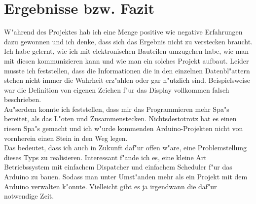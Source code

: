 \documentclass[a4paper]{scrreprt}
\begin{document}
	\chapter{Ergebnisse bzw. Fazit}
		W"ahrend des Projektes hab ich eine Menge positive wie negative Erfahrungen dazu 
		gewonnen und ich denke, dass sich das Ergebnis nicht zu verstecken braucht.
		Ich habe gelernt, wie ich mit elektronischen Bauteilen umzugehen habe, wie man 
		mit diesen kommunizieren kann und wie man ein solches Projekt aufbaut.
		Leider musste ich feststellen, dass die Informationen die in den einzelnen
		Datenbl"attern stehen nicht immer die Wahrheit erz"ahlen oder gar n"utzlich sind. 
		Beispielsweise war die Definition von eigenen Zeichen f"ur das Display 
		vollkommen falsch beschrieben. \\
		Au"serdem konnte ich feststellen, dass mir das Programmieren mehr Spa"s bereitet, als 
		das L"oten und Zusammenstecken. Nichtsdestotrotz hat es einen riesen Spa"s gemacht
		und ich w"urde kommenden Arduino-Projekten nicht von vornherein einen Stein in den
		Weg legen. \\
		Das bedeutet, dass ich auch in Zukunft daf"ur offen w"are, eine Problemstellung 
		dieses Typs zu realisieren.
		Interessant f"ande ich es, eine kleine Art Betriebssystem mit einfachem Dispatcher und
		einfachem Scheduler f"ur das Arduino zu bauen.
		Sodass man unter Umst"anden mehr als ein Projekt mit dem Arduino verwalten k"onnte.
		Vielleicht gibt es ja irgendwann die daf"ur notwendige Zeit.
		
\end{document}
